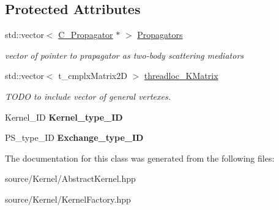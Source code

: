 \subsection*{Protected Attributes}
\begin{DoxyCompactItemize}
\item 
\hypertarget{class_c___abstract_kernel_aa60e6339b256ab24d835f35520df5052}{std\-::vector$<$ \hyperlink{class_c___propagator}{C\-\_\-\-Propagator} $\ast$ $>$ \hyperlink{class_c___abstract_kernel_aa60e6339b256ab24d835f35520df5052}{Propagators}}\label{class_c___abstract_kernel_aa60e6339b256ab24d835f35520df5052}

\begin{DoxyCompactList}\small\item\em vector of pointer to prapagator as two-\/body scattering mediators \end{DoxyCompactList}\item 
\hypertarget{class_c___abstract_kernel_aac115b60d8e20bd58262b92e403f0750}{std\-::vector$<$ t\-\_\-cmplx\-Matrix2\-D $>$ \hyperlink{class_c___abstract_kernel_aac115b60d8e20bd58262b92e403f0750}{threadloc\-\_\-\-K\-Matrix}}\label{class_c___abstract_kernel_aac115b60d8e20bd58262b92e403f0750}

\begin{DoxyCompactList}\small\item\em T\-O\-D\-O to include vector of general vertexes. \end{DoxyCompactList}\item 
\hypertarget{class_c___abstract_kernel_a2752ba2a46e476d657e8199cf55c2b3c}{Kernel\-\_\-\-I\-D {\bfseries Kernel\-\_\-type\-\_\-\-I\-D}}\label{class_c___abstract_kernel_a2752ba2a46e476d657e8199cf55c2b3c}

\item 
\hypertarget{class_c___abstract_kernel_a20b072a954f3f1ec0cd78350f1871cf8}{P\-S\-\_\-type\-\_\-\-I\-D {\bfseries Exchange\-\_\-type\-\_\-\-I\-D}}\label{class_c___abstract_kernel_a20b072a954f3f1ec0cd78350f1871cf8}

\end{DoxyCompactItemize}


The documentation for this class was generated from the following files\-:\begin{DoxyCompactItemize}
\item 
source/\-Kernel/Abstract\-Kernel.\-hpp\item 
source/\-Kernel/Kernel\-Factory.\-hpp\end{DoxyCompactItemize}
